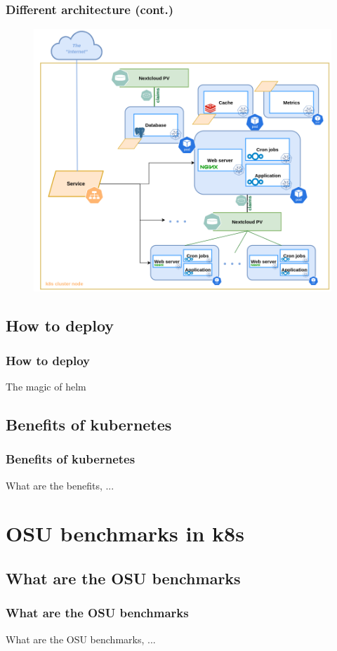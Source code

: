 \documentclass{beamer}
\begin{document}
\begin{frame}
    \frametitle{Different architecture (cont.)}
    \begin{figure}
        \includegraphics[height=0.85\textheight]{images/other/exadvanceddiagram}
    \end{figure}
\end{frame}

\subsection{How to deploy}
\begin{frame}
    \frametitle{How to deploy}
    The magic of helm
\end{frame}

\subsection{Benefits of kubernetes}
\begin{frame}
    \frametitle{Benefits of kubernetes}
    What are the benefits, ...
\end{frame}

\section{OSU benchmarks in k8s}
\subsection{What are the OSU benchmarks}
\begin{frame}
    \frametitle{What are the OSU benchmarks}
    What are the OSU benchmarks, ...
\end{frame}

\end{document}
